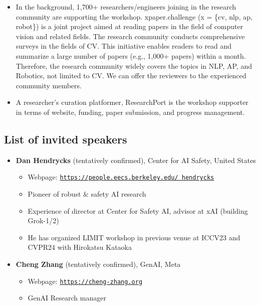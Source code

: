 \documentclass{article}
\begin{document}
\begin{itemize}
    \item In the background, 1,700+ researchers/engineers joining in the research community are supporting the workshop. xpaper.challenge (x = \{cv, nlp, ap, robot\}) is a joint project aimed at reading papers in the field of computer vision and related fields. The research community conducts comprehensive surveys in the fields of CV. This initiative enables readers to read and summarize a large number of papers (e.g., 1,000+ papers) within a month. Therefore, the research community widely covers the topics in NLP, AP, and Robotics, not limited to CV. We can offer the reviewers to the experienced community members.

    \item A researcher’s curation platformer, ResearchPort is the workshop supporter in terms of website, funding, paper submission, and progress management.
\end{itemize}

\subsection{List of invited speakers}

\begin{itemize}
    \item {\bf Dan Hendrycks} (tentatively confirmed), Center for AI Safety, United States
    \begin{itemize}
        \item Webpage: \href{https://people.eecs.berkeley.edu/~hendrycks}{\texttt{https://people.eecs.berkeley.edu/~hendrycks}}
        \item Pioneer of robust \& safety AI research
        \item Experience of director at Center for Safety AI, advisor at xAI (building Grok-1/2)
        \item He has organized LIMIT workshop in previous venue at ICCV23 and CVPR24 with Hirokatsu Kataoka
    \end{itemize}

    \item {\bf Cheng Zhang} (tentatively confirmed), GenAI, Meta
    \begin{itemize}
        \item Webpage: \href{https://cheng-zhang.org}{\texttt{https://cheng-zhang.org}}
        \item GenAI Research manager
    \end{itemize}
\end{itemize}
\end{document}
